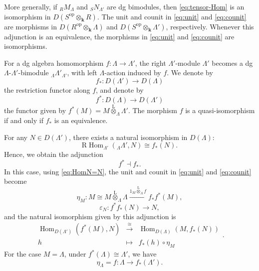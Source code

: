 \documentclass[11pt,a4paper,reqno]{amsart}
\theoremstyle{plain}
\numberwithin{equation}{section}
\theoremstyle{definition}
\newcommand{\Hom}{\operatorname{Hom}}
\newcommand{\Lotimes}{\overset{\mathrm L}{\otimes}}
\renewcommand{\k}{\mathbf{k}}
\begin{document}
More generally, if ${}_RM_\Lambda$ and ${}_SN_{\Lambda'}$ are dg bimodules, then \eqref{eq:tensor-Hom} is an isomorphism in $D(S^{\mathrm{op}}\otimes_{\k}R)$. The unit and counit in \eqref{eq:unit} and \eqref{eq:counit} are morphisms in $D(R^{\mathrm{op}}\otimes_{\k}\Lambda)$ and $D(S^{\mathrm{op}}\otimes_{\k}\Lambda')$, respectively. Whenever this adjunction is an equivalence, the morphisms in \eqref{eq:unit} and \eqref{eq:counit} are isomorphisms.

For a dg algebra homomorphism $f\colon\Lambda\to\Lambda'$, the right $\Lambda'$-module $\Lambda'$ becomes a dg $\Lambda$-$\Lambda'$-bimodule ${}_\Lambda\Lambda'_{\Lambda'}$, with left $\Lambda$-action induced by $f$. We denote by 
\[f_*\colon D(\Lambda')\to D(\Lambda)\]
the restriction functor along $f$, and denote by
\[f^*\colon D(\Lambda)\to D(\Lambda')\]
the functor given by $f^*(M)=M\Lotimes_{\Lambda}\Lambda'$. The morphism $f$ is a quasi-isomorphism if and only if $f_*$ is an equivalence.

For any $N\in D(\Lambda')$, there exists a natural isomorphism in $D(\Lambda)$:
\begin{equation}\label{eq:HomN=N}
    \mathrm R\!\Hom_{\Lambda'}({}_\Lambda\Lambda',N)
\cong f_*(N).
\end{equation}
Hence, we obtain the adjunction
\[
f^*\dashv f_*.
\]
In this case, using \eqref{eq:HomN=N}, the unit and counit in \eqref{eq:unit} and \eqref{eq:counit} become
\begin{equation}\label{eq:tensor-unit}
 \eta_M\colon M\cong M\overset{\mathrm L}{\otimes}_\Lambda\Lambda\xrightarrow{1_M\overset{\mathrm L}{\otimes}_\Lambda f} f_*f^*(M),
\end{equation}
\begin{equation}\label{eq:tensor-counit}
 \varepsilon_N\colon f^*f_*(N)\to N,
\end{equation}
and the natural isomorphism given by this adjunction is
\begin{equation}\label{eq:adjun-exp}
  \begin{array}{ccc}
    \Hom_{D(\Lambda')}(f^*(M),N) & \xrightarrow{\cong} & \Hom_{D(\Lambda)}(M,f_*(N))\\
    h & \mapsto & f_*(h)\circ\eta_M
  \end{array}.
\end{equation}
For the case $M=\Lambda$, under $f^*(\Lambda)\cong\Lambda'$, we have
\begin{equation}\label{eq:unit-algebra}
 \eta_\Lambda=f\colon\Lambda\to f_*(\Lambda').
\end{equation}
\end{document}
